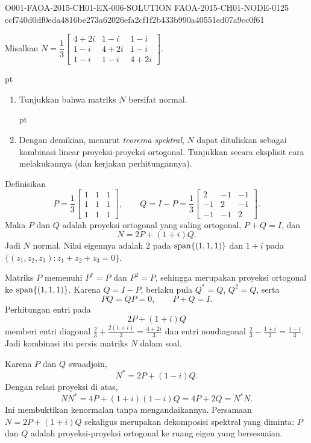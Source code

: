 \begin{o001solution}
  {O001-FAOA-2015-CH01-EX-006-SOLUTION}
  {FAOA-2015-CH01-NODE-0125}
  {ccf740d0df0eda4816be273a62026efa2cf1f2b433b990a40551ed07a9cc0f61}
\begin{o001statement}
Misalkan $N = \dfrac13\begin{bmatrix}
                                4+2i & 1-i  & 1-i  \\
                                1-i  & 4+2i & 1-i  \\
                                1-i  & 1-i  & 4+2i \end{bmatrix}$.

 pt
 \begin{enumerate}
  \item Tunjukkan bahwa matriks $N$ bersifat normal.

 pt

  \item Dengan demikian, menurut \emph{teorema spektral}, $N$
dapat dituliskan sebagai kombinasi linear proyeksi-proyeksi ortogonal.
Tunjukkan secara eksplisit cara melakukannya (dan kerjakan perhitungannya).
 \end{enumerate}
\end{o001statement}
\begin{o001answer}
Definisikan
\[
P=\frac13\begin{bmatrix}1&1&1\\1&1&1\\1&1&1\end{bmatrix},
\qquad
Q=I-P=\frac13\begin{bmatrix}2&-1&-1\\-1&2&-1\\-1&-1&2\end{bmatrix}.
\]
Maka $P$ dan $Q$ adalah proyeksi ortogonal yang saling ortogonal,
$P+Q=I$, dan
\[
N=2P+(1+i)Q.
\]
Jadi $N$ normal. Nilai eigennya adalah $2$ pada
$\operatorname{span}\{(1,1,1)\}$ dan $1+i$ pada
$\{(z_1,z_2,z_3):z_1+z_2+z_3=0\}$.
\end{o001answer}
\begin{o001proof}
Matriks $P$ memenuhi $P^*=P$ dan $P^2=P$, sehingga merupakan proyeksi
ortogonal ke $\operatorname{span}\{(1,1,1)\}$. Karena $Q=I-P$, berlaku pula
$Q^*=Q$, $Q^2=Q$, serta
\[
PQ=QP=0,\qquad P+Q=I.
\]
Perhitungan entri pada
\[
2P+(1+i)Q
\]
memberi entri diagonal
$\frac23+\frac{2(1+i)}3=\frac{4+2i}{3}$ dan entri nondiagonal
$\frac23-\frac{1+i}{3}=\frac{1-i}{3}$. Jadi kombinasi itu persis matriks
$N$ dalam soal.

Karena $P$ dan $Q$ swaadjoin,
\[
N^*=2P+(1-i)Q.
\]
Dengan relasi proyeksi di atas,
\[
NN^*=4P+(1+i)(1-i)Q=4P+2Q=N^*N.
\]
Ini membuktikan kenormalan tanpa mengandaikannya. Persamaan
$N=2P+(1+i)Q$ sekaligus merupakan dekomposisi spektral yang diminta:
$P$ dan $Q$ adalah proyeksi-proyeksi ortogonal ke ruang eigen yang
bersesuaian.
\end{o001proof}
\end{o001solution}
